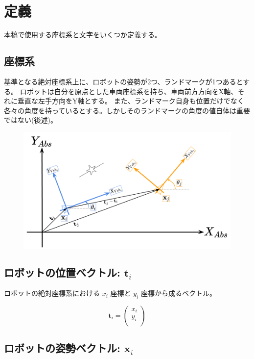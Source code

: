\documentclass{article}
\begin{document}
\newpage

\section{定義}

本稿で使用する座標系と文字をいくつか定義する。

\subsection{座標系}

基準となる絶対座標系上に、ロボットの姿勢が2つ、ランドマークが1つあるとする。
ロボットは自分を原点とした車両座標系を持ち、車両前方方向をX軸、それに垂直な左手方向をY軸とする。
また、ランドマーク自身も位置だけでなく各々の角度を持っているとする。しかしそのランドマークの角度の値自体は重要ではない(後述)。

\begin{figure}[h!]
  \centering
  \includegraphics[width=\textwidth]{2-1_coordinate.png}
\end{figure}

\subsection{ロボットの位置ベクトル: $\bm{t}_i$}

ロボットの絶対座標系における $x_i$ 座標と $y_i$ 座標から成るベクトル。

\[
\bm{t}_i =
\left(
  \begin{array}{c}
    x_i \\
    y_i \\
  \end{array}
\right)
\]

\subsection{ロボットの姿勢ベクトル: $\bm{x}_i$}
\end{document}
